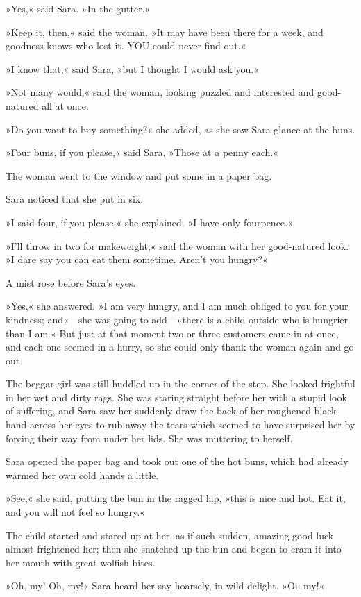 »Yes,« said Sara. »In the gutter.«

»Keep it, then,« said the woman. »It may have been there for a week, and goodness knows who lost it. YOU could never find out.«

»I know that,« said Sara, »but I thought I would ask you.«

»Not many would,« said the woman, looking puzzled and interested and good-natured all at once.

»Do you want to buy something?« she added, as she saw Sara glance at the buns.

»Four buns, if you please,« said Sara. »Those at a penny each.«

The woman went to the window and put some in a paper bag.

Sara noticed that she put in six.

»I said four, if you please,« she explained. »I have only fourpence.«

»I'll throw in two for makeweight,« said the woman with her good-natured look. »I dare say you can eat them sometime. Aren't you hungry?«

A mist rose before Sara's eyes.

»Yes,« she answered. »I am very hungry, and I am much obliged to you for your kindness; and«—she was going to add—»there is a child outside who is hungrier than I am.« But just at that moment two or three customers came in at once, and each one seemed in a hurry, so she could only thank the woman again and go out.

The beggar girl was still huddled up in the corner of the step. She looked frightful in her wet and dirty rags. She was staring straight before her with a stupid look of suffering, and Sara saw her suddenly draw the back of her roughened black hand across her eyes to rub away the tears which seemed to have surprised her by forcing their way from under her lids. She was muttering to herself.

Sara opened the paper bag and took out one of the hot buns, which had already warmed her own cold hands a little.

»See,« she said, putting the bun in the ragged lap, »this is nice and hot. Eat it, and you will not feel so hungry.«

The child started and stared up at her, as if such sudden, amazing good luck almost frightened her; then she snatched up the bun and began to cram it into her mouth with great wolfish bites.

»Oh, my! Oh, my!« Sara heard her say hoarsely, in wild delight. »\textsc{Oh} my!«


